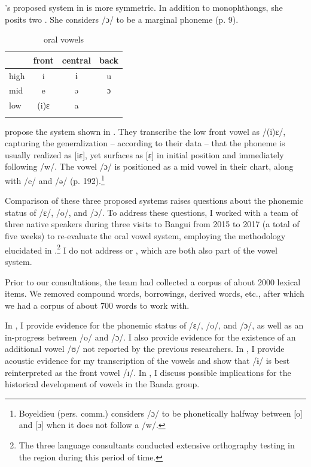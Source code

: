 \documentclass[output=paper,colorlinks,citecolor=brown]{langscibook}
\begin{document}
\citeauthor{Théret-Kieschke1998}’s proposed system in  is more  symmetric. In addition to monophthongs, she posits two . She considers /ɔ/ to be a marginal phoneme  (p. 9).

\begin{table}
\caption{ oral vowels \citep[191]{BoyeldieuCloarec-Heiss2001}}
\label{tab:olson:3}
    \begin{tabular}{lccc}
    \lsptoprule
                & front & central & back\\
    \midrule
    high        & i     & ɨ       & u\\
    mid         & e     & ə       & ɔ\\
    low         & (i)ɛ  & a       &\\
    \lspbottomrule
    \end{tabular}
\end{table}

\citeauthor{BoyeldieuCloarec-Heiss2001} propose the system shown in . They transcribe the low front vowel as /(i)ɛ/, capturing the generalization -- according to their data -- that the phoneme is usually realized as [iɛ], yet surfaces as [ɛ] in initial position and immediately following /w/. The vowel /ɔ/ is positioned as a mid vowel in their chart, along with /e/ and /ə/ (p. 192).\footnote{Boyeldieu (pers. comm.) considers /ɔ/ to be phonetically halfway between [o] and [ɔ] when it does not follow a /w/.}

Comparison of these three proposed systems  raises questions about the phonemic status of /ɛ/, /o/, and /ɔ/. To address these questions, I worked with a team of three native  speakers during three visits to Bangui from 2015 to 2017 (a total of five weeks) to re-evaluate the oral vowel system, employing the  methodology elucidated in \citet{Kutsch-Lojenga1996}.\footnote{The three language consultants conducted extensive orthography testing in the  region during this period of time.}  I do not address  or , which are both also part of the   vowel system.

Prior to our consultations, the team had collected a corpus of about 2000 lexical items. We removed compound words, borrowings, derived words, etc., after which we had a corpus of about 700 words to work with.

In , I provide evidence for the phonemic status of /ɛ/, /o/, and /ɔ/, as well as an in-progress  between /o/ and /ɔ/. I also provide evidence for the existence of an additional vowel /ʊ/ not reported by the previous researchers. In , I provide acoustic evidence for my transcription of the vowels and show that /ɨ/ is best reinterpreted as the front vowel /ɪ/. In , I discuss possible implications for the historical development of vowels in the Banda  group.
\end{document}
